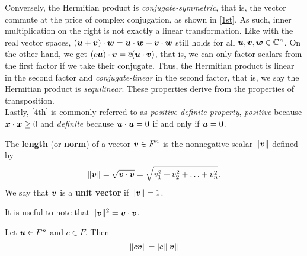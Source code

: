 Conversely, the Hermitian product is \emph{conjugate-symmetric}, that is, the vector commute at the price of complex conjugation, as shown in \ref{1st}. As such, inner multiplication on the right is not exactly a linear transformation. Like with the real vector spaces, $(\boldsymbol u+\boldsymbol v)\cdot \boldsymbol w = \boldsymbol u\cdot \boldsymbol w + \boldsymbol v\cdot \boldsymbol w$ still holds for all $\boldsymbol u, \boldsymbol v, \boldsymbol w\in \mathbb{C}^n$. On the other hand, we get $(c\boldsymbol u)\cdot \boldsymbol v= \overline{c}(\boldsymbol u\cdot \boldsymbol v)$, that is, we can only factor scalars from the first factor if we take their conjugate. Thus, the Hermitian product is linear in the second factor and \emph{conjugate-linear} in the second factor, that is, we say the Hermitian product is \emph{sequilinear}. These properties derive from the properties of transposition.\\

Lastly, \ref{4th} is commonly referred to as \emph{positive-definite property}\footnotemark[3], \emph{positive} because $\boldsymbol x\cdot \boldsymbol x\ge 0$ and \emph{definite} because $\boldsymbol u\cdot \boldsymbol u=0$ if and only if $\boldsymbol u=0$. 



\begin{Def} The \textbf{length} (or \textbf{norm}) of a vector $\boldsymbol v\in F^n$ is the nonnegative scalar $\Vert \boldsymbol v\Vert$ defined by
\[\Vert \boldsymbol v\Vert = \sqrt{\boldsymbol v\cdot \boldsymbol v} = \sqrt{v_1^2+v_2^2 + \ldots + v_n^2}.\] We say that $\boldsymbol v$ is a \textbf{unit vector} if $\Vert \boldsymbol v\Vert = 1$.
\end{Def}\vs

It is useful to note that $\Vert \boldsymbol v\Vert^2 = \boldsymbol v\cdot \boldsymbol v$.\\

\begin{Thm} Let $\bb u%
\in F^n$ and $c\in F$. Then 
$$\Vert c\boldsymbol v\Vert = |c|\Vert \boldsymbol v\Vert$$
\end{Thm}\vs


